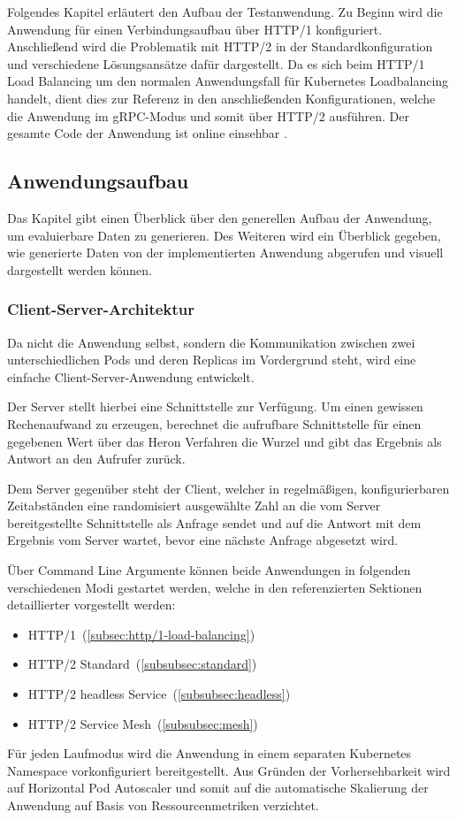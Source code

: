Folgendes Kapitel erläutert den Aufbau der Testanwendung.
Zu Beginn wird die Anwendung für einen Verbindungsaufbau über HTTP/1 konfiguriert.
Anschließend wird die Problematik mit HTTP/2 in der Standardkonfiguration und verschiedene Lösungsansätze dafür dargestellt.
Da es sich beim HTTP/1 Load Balancing um den normalen Anwendungsfall für Kubernetes Loadbalancing handelt, dient dies zur Referenz in den anschließenden Konfigurationen, welche die Anwendung im gRPC-Modus und somit über HTTP/2 ausführen.
Der gesamte Code der Anwendung ist online einsehbar \cite{github}.

\subsection{Anwendungsaufbau}\label{subsec:anwendungsaufbau}
Das Kapitel gibt einen Überblick über den generellen Aufbau der Anwendung, um evaluierbare Daten zu generieren.
Des Weiteren wird ein Überblick gegeben, wie generierte Daten von der implementierten Anwendung abgerufen und visuell dargestellt werden können.

\subsubsection{Client-Server-Architektur}
Da nicht die Anwendung selbst, sondern die Kommunikation zwischen zwei unterschiedlichen Pods und deren Replicas im Vordergrund steht, wird eine einfache Client-Server-Anwendung entwickelt.

Der Server stellt hierbei eine Schnittstelle zur Verfügung.
Um einen gewissen Rechenaufwand zu erzeugen, berechnet die aufrufbare Schnittstelle für einen gegebenen Wert über das Heron Verfahren die Wurzel und gibt das Ergebnis als Antwort an den Aufrufer zurück.

Dem Server gegenüber steht der Client, welcher in regelmäßigen, konfigurierbaren Zeit\-ab\-stän\-den eine randomisiert ausgewählte Zahl an die vom Server bereitgestellte Schnittstelle als Anfrage sendet und auf die Antwort mit dem Ergebnis vom Server wartet, bevor eine nächste Anfrage abgesetzt wird.

Über Command Line Argumente können beide Anwendungen in folgenden verschiedenen Modi gestartet werden, welche in den referenzierten Sektionen detaillierter vorgestellt werden:
\begin{itemize}
    \item HTTP/1~(\ref{subsec:http/1-load-balancing})
    \item HTTP/2 Standard~(\ref{subsubsec:standard})
    \item HTTP/2 headless Service~(\ref{subsubsec:headless})
    \item HTTP/2 Service Mesh~(\ref{subsubsec:mesh})
\end{itemize}
Für jeden Laufmodus wird die Anwendung in einem separaten Kubernetes Namespace vorkonfiguriert bereitgestellt.
Aus Gründen der Vorhersehbarkeit wird auf Horizontal Pod Autoscaler und somit auf die automatische Skalierung der Anwendung auf Basis von Ressourcenmetriken verzichtet.

